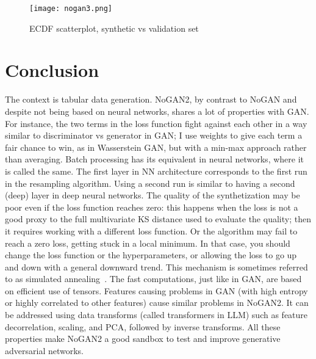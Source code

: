 \documentclass[oneside,10pt]{book}
\begin{document}
\begin{figure}[H]
\centering
\texttt{[image: nogan3.png]} %
\caption{ECDF scatterplot, synthetic vs validation set}
\label{fig:nogan3h}
\end{figure}

 
\section{Conclusion}

The context is tabular data generation. 
NoGAN2, by contrast to NoGAN and despite not being based on neural networks, shares a lot of properties with GAN. For instance, the two terms in the loss function fight against each other in a way similar to discriminator vs generator in GAN; I use weights to give each term a fair chance to win, as in \textcolor{index}{Wasserstein GAN}, but with a min-max approach rather than averaging. \textcolor{index}{Batch processing} has its equivalent in neural networks, where it is called the same. The first layer in NN architecture corresponds to the first run in the resampling algorithm. Using a second run is similar to having a second (deep) layer in  \textcolor{index}{deep neural networks}. The quality of the synthetization may be poor even if the \textcolor{index}{loss function} reaches zero: this happens when the loss is not a good proxy to the full multivariate KS distance used to evaluate the quality; then it requires working with a different loss function. Or the algorithm may fail to reach a zero loss, getting stuck in a local minimum. In that case, you should change the loss function or the hyperparameters, or allowing the loss to go up and down with a general downward trend. This mechanism is sometimes referred to as 
\textcolor{index}{simulated annealing}~\cite{vgieee}. The fast computations, just like in GAN, are based on efficient use of tensors. Features causing problems in GAN (with high entropy or highly correlated to other features) cause similar problems in NoGAN2. It can be addressed using data transforms (called \textcolor{index}{transformers} in LLM) such as feature decorrelation, scaling,  and PCA, followed by inverse transforms. All these properties make NoGAN2 a good sandbox to test and improve generative adversarial networks. 
\end{document}
